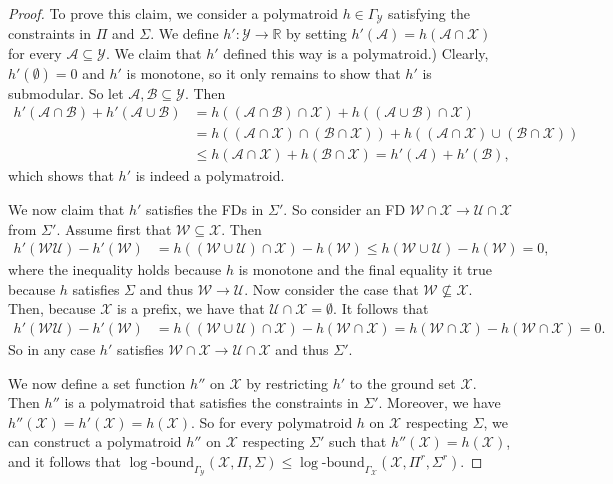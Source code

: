 \documentclass[10pt,a4paper]{amsart}
\newcommand{\logb}{\mathrm{\log\text{-}bound}}
\newcommand{\vset}[1]{\mathcal{#1}}
\begin{document}
\begin{proof}
To prove this claim, we consider a polymatroid $h\in \Gamma_{\vset Y}$ satisfying the constraints in $\Pi$ and $\Sigma$. We define $h': \vset Y\rightarrow \mathbb{R}$ by setting  $h'(\vset A) = h(\vset A\cap \vset X)$ for every $\vset A\subseteq \vset Y$.
%
%
We claim that $h'$ defined this way is a polymatroid.)
Clearly, $h'(\emptyset) = 0$ and $h'$ is monotone, so it only remains to show that $h'$ is submodular. So let $\vset A, \vset B\subseteq \vset Y$. Then 
	\begin{align*}
		h'(\vset A \cap \vset B) + h'(\vset A \cup \vset B) & = h((\vset A \cap \vset B)\cap \vset X) + h((\vset A \cup \vset B)\cap \vset X)\\
		&= h((\vset A \cap \vset X)\cap (\vset B\cap \vset X)) + h((\vset A \cap \vset X) \cup (\vset B\cap \vset X))\\
		&\le h(\vset A \cap \vset X) + h(\vset B\cap \vset X)%
		= h'(\vset A) + h'(\vset B),
	\end{align*}
	which shows that $h'$ is indeed a polymatroid.
	
	We now claim that $h'$ satisfies the FDs in $\Sigma'$. So consider an FD $\vset W\cap \vset X \rightarrow \vset U\cap \vset X$ from $\Sigma'$. Assume first that $\vset W\subseteq \vset X$. Then 
	\begin{align*}
		h'(\vset W\vset U) - h'(\vset W) & = h((\vset W \cup \vset U)\cap \vset X) - h(\vset W)%
		\le h(\vset W\cup \vset U) - h(\vset W)%
		= 0,
	\end{align*}
	where the inequality holds because $h$ is monotone and the final equality it true because $h$ satisfies $\Sigma$ and thus $\vset W \rightarrow \vset U$. Now consider the case that $\vset W \nsubseteq \vset X$. Then, because $\vset X$ is a prefix, we have that $\vset U \cap \vset X = \emptyset$. It follows that 
	\begin{align*}
	h'(\vset W\vset U) - h'(\vset W) & = h((\vset W \cup \vset U)\cap \vset X) - h(\vset W\cap \vset X)%
	= h(\vset W \cap \vset X) - h(\vset W\cap \vset X)%
	= 0.
	\end{align*}
	So in any case $h'$ satisfies $\vset W\cap \vset X \rightarrow \vset U \cap \vset X$ and thus $\Sigma'$.
	
	We now define a set function $h''$ on $\vset X$ by restricting $h'$ to the ground set $\vset X$. Then $h''$ is a polymatroid that satisfies the constraints in $\Sigma'$. Moreover, we have $h''(\vset X) = h'(\vset X) = h(\vset X)$. So for every polymatroid $h$ on $\vset X$ respecting $\Sigma$, we can construct a polymatroid $h''$ on $\vset X$ respecting $\Sigma'$ such that $h''(\vset X) = h(\vset X)$, and it follows that $\logb_{\Gamma_{\vset Y}}(\vset X, \Pi, \Sigma) \le \logb_{\Gamma_{\vset X}}(\vset X, \Pi^r, \Sigma^r)$.


\end{proof}
\end{document}
